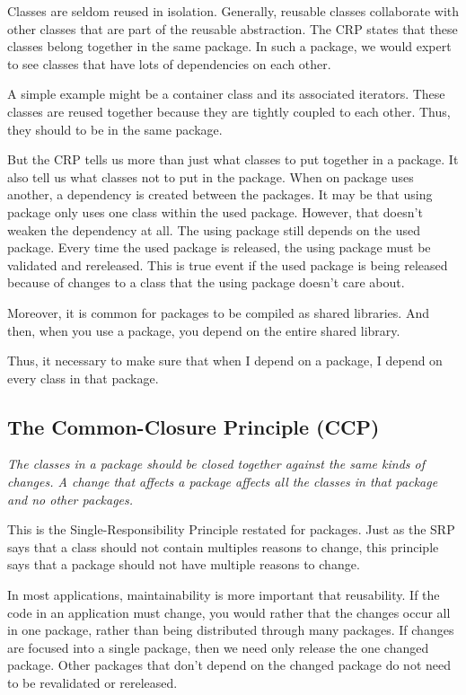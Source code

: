 \documentclass[12pt]{report}
\newcommand\tab[1][1cm]{\hspace*{#1}}
\begin{document}
Classes are seldom reused in isolation. Generally, reusable classes 
collaborate with other classes that are part of 
the reusable abstraction. The CRP states that these classes belong together
in the same package. 
In such a package, we would expert to see classes that have lots of 
dependencies on each other.

A simple example might be a container class and its associated iterators. 
These classes are reused together
because they are tightly coupled to each other. 
Thus, they should to be in the same package.

But the CRP tells us more than just what 
classes to put together in a package. 
It also tell us what classes not to put in the package.
When on package uses another, a dependency is created between the packages.
It may be that using package only uses one class within the used package. 
However, that doesn't weaken the dependency at all. 
The using package still depends on the used package. 
Every time the used package is released, the using package must be validated and rereleased.
This is true event if the used package is being released because of changes to a class that the using package doesn't care about.

Moreover, it is common for packages to be compiled as shared libraries.
And then, when you use a package, you depend on the entire shared library.

Thus, it necessary to make sure that when I depend on a package, I depend on every class in that package. 
\subsection{The Common-Closure Principle (CCP)}

\tab \textit{The classes in a package should be closed together 
against the same kinds of changes. 
A change that affects a package affects all 
the classes in that package and no other packages.} \cite{Granularity}

This is the Single-Responsibility Principle 
restated for packages. 
Just as the SRP says that a class should not 
contain multiples reasons to change, 
this principle says that a package should not 
have multiple reasons to change.

In most applications, maintainability is more important that reusability. 
If the code in an application must
change, you would rather that the changes occur 
all in one package, rather than being distributed through many
packages. If changes are focused into a single package, 
then we need only release the one changed package. 
Other packages that don't depend on the changed package 
do not need to be revalidated or rereleased.
\end{document}

